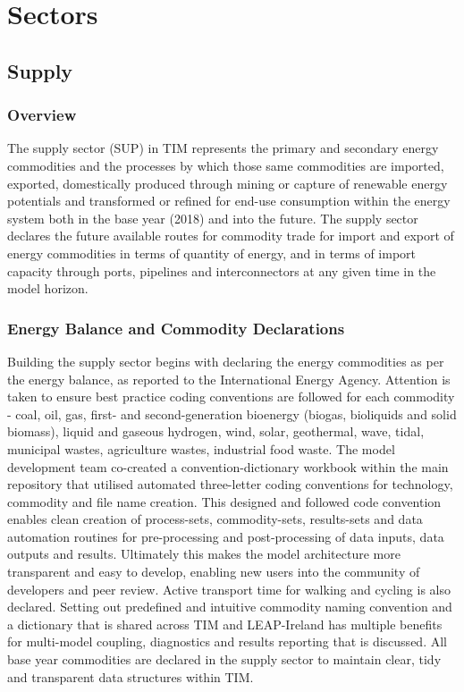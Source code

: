 \documentclass[gmd,manuscript]{copernicus}
\begin{document}
\section{Sectors}
\label{s:sectors}

\subsection{Supply}
\label{ss:supply}
\subsubsection{Overview}
The supply sector (SUP) in TIM represents the primary and secondary energy commodities and the processes by which those same commodities are imported, exported, domestically produced through mining or capture of renewable energy potentials and transformed or refined for end-use consumption within the energy system both in the base year (2018) and into the future. The supply sector declares the future available routes for commodity trade for import and export of energy commodities in terms of quantity of energy, and in terms of import capacity through ports, pipelines and interconnectors at any given time in the model horizon. 

\subsubsection{Energy Balance and Commodity Declarations}
Building the supply sector begins with declaring the energy commodities as per the \citet{SEAI2019} energy balance, as reported to the International Energy Agency. Attention is taken to ensure best practice coding conventions are followed for each commodity - coal, oil, gas, first- and second-generation bioenergy (biogas, bioliquids and solid biomass), liquid and gaseous hydrogen, wind, solar, geothermal, wave, tidal, municipal wastes, agriculture wastes, industrial food waste. The model development team co-created a convention-dictionary workbook within the main repository that utilised automated three-letter coding conventions for technology, commodity and file name creation. This designed and followed code convention enables clean creation of process-sets, commodity-sets, results-sets and data automation routines for pre-processing and post-processing of data inputs, data outputs and results. Ultimately this makes the model architecture more transparent and easy to develop, enabling new users into the community of developers and peer review. Active transport time for walking and cycling is also declared. Setting out predefined and intuitive commodity naming convention and a dictionary that is shared across TIM and LEAP-Ireland has multiple benefits for multi-model coupling, diagnostics and results reporting that is discussed. All base year commodities are declared in the supply sector to maintain clear, tidy and transparent data structures within TIM.
\end{document}
